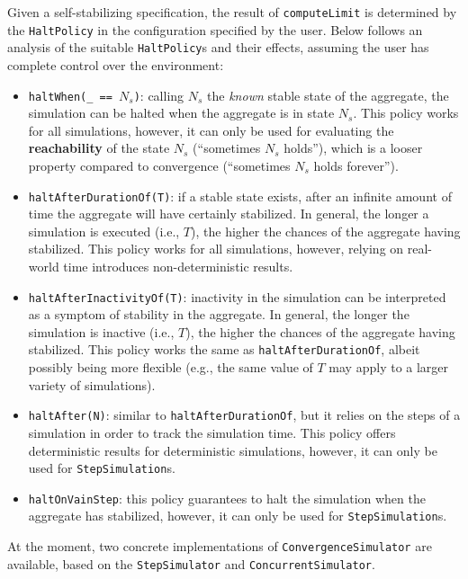 Given a self-stabilizing specification, the result of \texttt{computeLimit} is
determined by the \texttt{HaltPolicy} in the configuration specified by the
user. Below follows an analysis of the suitable \texttt{HaltPolicy}s and their
effects, assuming the user has complete control over the environment:
\begin{itemize}
  \item \texttt{haltWhen(\_ == $N_s$)}: calling $N_s$ the \textit{known} stable
        state of the aggregate, the simulation can be halted when the aggregate
        is in state $N_s$. This policy works for all simulations, however, it
        can only be used for evaluating the \textbf{reachability} of the state
        $N_s$ (\enquote{sometimes $N_s$ holds}), which is a looser property
        compared to convergence (\enquote{sometimes $N_s$ holds forever}).
  \item \texttt{haltAfterDurationOf(T)}: if a stable state exists, after an
        infinite amount of time the aggregate will have certainly stabilized.
        In general, the longer a simulation is executed (i.e., $T$), the
        higher the chances of the aggregate having stabilized. This policy
        works for all simulations, however, relying on real-world time
        introduces non-deterministic results.
  \item \texttt{haltAfterInactivityOf(T)}: inactivity in the simulation can be
        interpreted as a symptom of stability in the aggregate. In general,
        the longer the simulation is inactive (i.e., $T$), the higher the
        chances of the aggregate having stabilized. This policy works the same
        as \texttt{haltAfterDurationOf}, albeit possibly being more flexible
        (e.g., the same value of $T$ may apply to a larger variety of
        simulations).
  \item \texttt{haltAfter(N)}: similar to \texttt{haltAfterDurationOf}, but it
        relies on the steps of a simulation in order to track the simulation
        time. This policy offers deterministic results for deterministic
        simulations, however, it can only be used for \texttt{StepSimulation}s.
  \item \texttt{haltOnVainStep}: this policy guarantees to halt the simulation
        when the aggregate has stabilized, however, it can only be used for
        \texttt{StepSimulation}s.
\end{itemize}

At the moment, two concrete implementations of \texttt{ConvergenceSimulator}
are available, based on the \texttt{StepSimulator} and
\texttt{ConcurrentSimulator}.

